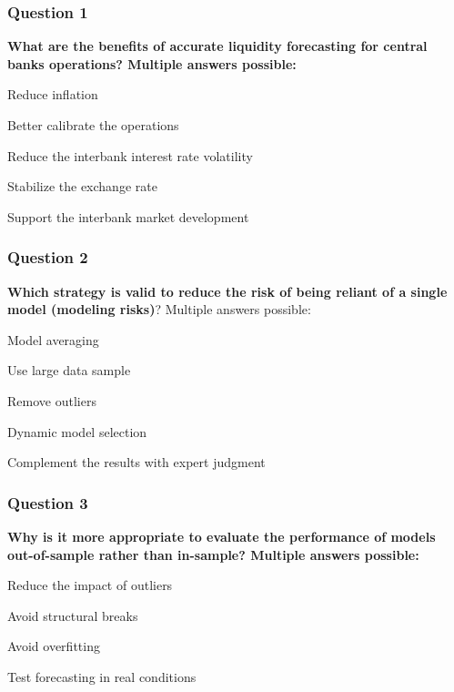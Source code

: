 \documentclass{beamer}
\newenvironment{wideenumerate}{\enumerate\addtolength{\itemsep}{10pt}}{\endenumerate}
\begin{document}
\begin{frame}
  \frametitle{Question 1}
  
  \textbf{What are the benefits of accurate liquidity forecasting for central banks operations? Multiple answers possible:}\\

  \bigskip

  \begin{wideenumerate}
    \item Reduce inflation
    \item Better calibrate the operations
    \item Reduce the interbank interest rate volatility 
    \item Stabilize the exchange rate
    \item Support the interbank market development
  \end{wideenumerate}
  
\end{frame}



\begin{frame}
  \frametitle{Question 2}
  \textbf{Which strategy is valid to reduce the risk of being reliant of a single model (modeling risks)}? Multiple answers possible:\\
  \bigskip

  \begin{wideenumerate}
  \item Model averaging
  \item Use large data sample 
  \item Remove outliers
  \item Dynamic model selection
  \item Complement the results with expert judgment
   
  \end{wideenumerate}
  
\end{frame}



\begin{frame}
  \frametitle{Question 3}

  \textbf{Why is it more appropriate to evaluate the performance of models out-of-sample rather than in-sample? Multiple answers possible:}\\
  \bigskip
  
  \begin{wideenumerate}
    \item Reduce the impact of outliers
    \item Avoid structural breaks
    \item Avoid overfitting
    \item Test forecasting in real conditions
  \end{wideenumerate}
\end{frame}
\end{document}

